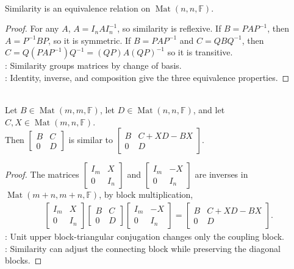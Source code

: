 \begin{proposition} \label{prop:similarity-equivalence-relation} \\
Similarity is an equivalence relation on $\operatorname{Mat}(n,n,\mathbb{F})$.
\begin{proof}
For any $A$, $A=I_nAI_n^{-1}$, so similarity is reflexive. If $B=PAP^{-1}$, then $A=P^{-1}BP$, so it is symmetric. If $B=PAP^{-1}$ and $C=QBQ^{-1}$, then $C=Q(PAP^{-1})Q^{-1}=(QP)A(QP)^{-1}$ so it is transitive.\\
: Similarity groups matrices by change of basis.\\
: Identity, inverse, and composition give the three equivalence properties.
\end{proof}
\end{proposition}

\begin{proposition} \label{prop:upper-block-triangular-similarity-shift} \\
Let $B\in\operatorname{Mat}(m,m,\mathbb{F})$, let $D\in\operatorname{Mat}(n,n,\mathbb{F})$, and let $C,X\in\operatorname{Mat}(m,n,\mathbb{F})$.\\
Then $\begin{bmatrix}
B & C\\
0 & D
\end{bmatrix}
$ is similar to $\begin{bmatrix}
B & C+XD-BX\\
0 & D
\end{bmatrix}$.
\begin{proof}
The matrices $\begin{bmatrix} I_m & X\\ 0 & I_n \end{bmatrix}$ and $\begin{bmatrix} I_m & -X\\ 0 & I_n \end{bmatrix}$ are inverses in $\operatorname{Mat}(m+n,m+n,\mathbb{F})$, by block multiplication,
\begin{align}
\begin{bmatrix}
I_m & X\\
0 & I_n
\end{bmatrix}
\begin{bmatrix}
B & C\\
0 & D
\end{bmatrix}
\begin{bmatrix}
I_m & -X\\
0 & I_n
\end{bmatrix}
=
\begin{bmatrix}
B & C+XD-BX\\
0 & D
\end{bmatrix}.
\nonumber
\end{align}
: Unit upper block-triangular conjugation changes only the coupling block.\\
: Similarity can adjust the connecting block while preserving the diagonal blocks.
\end{proof}
\end{proposition}

